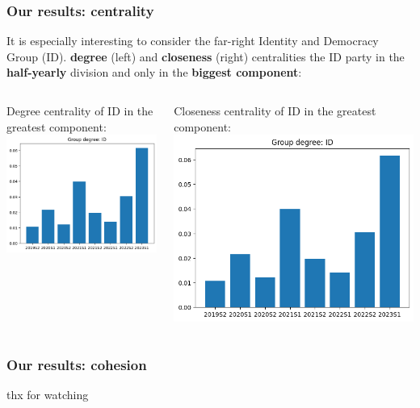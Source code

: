 \documentclass{beamer}
\begin{document}
\begin{frame}
\frametitle{Our results: centrality}
	
	It is especially interesting to consider the far-right Identity and Democracy Group (ID).
	 \textbf{degree} (left) and \textbf{closeness} (right) centralities the ID party in the \textbf{half-yearly} division and only in the \textbf{biggest component}:
	\vspace{4mm}
	\pause
	
\begin{columns}
	\begin{column}{0.5\textwidth}
	Degree centrality of ID in the greatest component:
	\\
	\includegraphics[width=\textwidth]{img/ID_HY_deg.png}
	\end{column}
	
	\pause 
	\begin{column}{0.5\textwidth}
	Closeness centrality of ID in the greatest component:
	\includegraphics[width=\textwidth]{img/ID_HY_deg.png}
	\end{column}
\end{columns}

\end{frame}


\begin{frame}
\frametitle{Our results: cohesion}
\end{frame}



\begin{frame}{}
	
	thx for watching
	
\end{frame}
\end{document}
